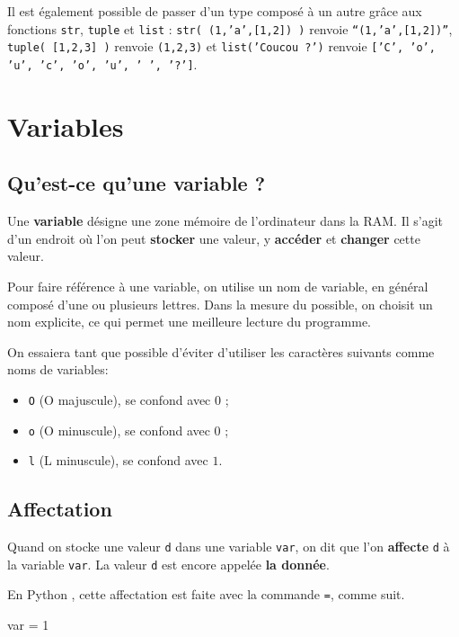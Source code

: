 Il est également possible de passer d'un type composé à un autre grâce aux fonctions \texttt{str}, 
\texttt{tuple} et \texttt{list} : \texttt{str( (1,'a',[1,2]) )} renvoie \texttt{``(1,'a',[1,2])''}, 
\texttt{tuple( [1,2,3] )} renvoie \texttt{(1,2,3)} et \texttt{list('Coucou ?')} renvoie 
\texttt{['C', 'o', 'u', 'c', 'o', 'u', ' ', '?']}.


\section{Variables}

\subsection{Qu'est-ce qu'une variable ?}

Une \textbf{variable} désigne une zone mémoire de l'ordinateur dans la RAM.
Il s'agit d'un endroit où l'on peut \textbf{stocker} une valeur, y \textbf{accéder} et 
\textbf{changer} cette valeur.

Pour faire référence à une variable, on utilise un nom de variable, en général composé d'une ou 
plusieurs lettres. Dans la mesure du possible, on choisit un nom explicite, ce qui permet une 
meilleure lecture du programme.

On essaiera tant que possible d'éviter d'utiliser les caractères suivants comme noms de variables:
\begin{itemize}
  \item \texttt{O} (O majuscule), se confond avec $0$ ;
  \item \texttt{o} (O minuscule), se confond avec $0$ ;
  \item \texttt{l} (L minuscule), se confond avec $1$. 
\end{itemize}


\subsection{Affectation}

Quand on stocke une valeur \texttt{d} dans une variable \texttt{var}, on dit que l'on 
\textbf{affecte} \texttt{d} à la variable \texttt{var}. La valeur
\texttt{d} est encore appelée \textbf{la donnée}.

En Python , cette affectation est faite avec la commande \texttt{=}, comme suit.  

\begin{pyconsole}
var  = 1
\end{pyconsole}


